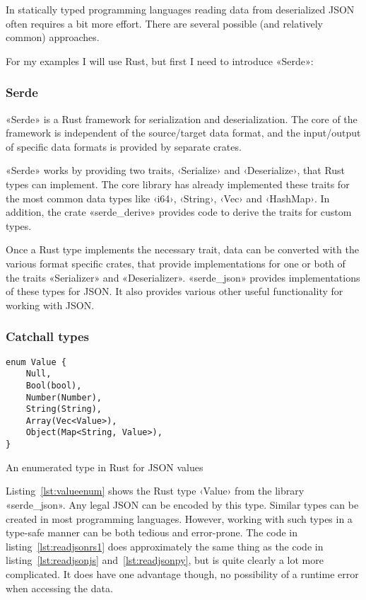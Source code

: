 In statically typed programming languages reading data from deserialized JSON often requires a bit more effort. There are several possible (and relatively common) approaches.

For my examples I will use Rust, but first I need to introduce «Serde»:

\subsubsection{Serde}
\label{sec:serde}

«Serde» is a Rust framework for serialization and deserialization. The core of the framework is independent of the source/target data format, and the input/output of specific data formats is provided by separate crates.

«Serde» works by providing two traits, ‹Serialize› and ‹Deserialize›, that Rust types can implement. The core library has already implemented these traits for the most common data types like ‹i64›, ‹String›, ‹Vec› and ‹HashMap›. In addition, the crate «serde_derive» provides code to derive the traits for custom types.

Once a Rust type implements the necessary trait, data can be converted with the various format specific crates, that provide implementations for one or both of the traits «Serializer» and «Deserializer». «serde_json» provides implementations of these types for JSON. It also provides various other useful functionality for working with JSON.

\subsubsection{Catchall types}

\begin{listing}[ht!]
\begin{verbatim}
enum Value {
    Null,
    Bool(bool),
    Number(Number),
    String(String),
    Array(Vec<Value>),
    Object(Map<String, Value>),
}
\end{verbatim}
\caption{An enumerated type in Rust for JSON values}
\label{lst:valueenum}
\end{listing}

Listing~\ref{lst:valueenum} shows the Rust type ‹Value› from the library «serde_json». Any legal JSON can be encoded by this type. Similar types can be created in most programming languages. However, working with such types in a type-safe manner can be both tedious and error-prone. The code in listing~\ref{lst:readjsonrs1} does approximately the same thing as the code in listing~\ref{lst:readjsonjs} and~\ref{lst:readjsonpy}, but is quite clearly a lot more complicated. It does have one advantage though, no possibility of a runtime error when accessing the data.

